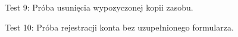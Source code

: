 \begin{figure}[H]
    \centering
    \caption{Test 9: Próba usunięcia wypozyczonej kopii zasobu.}
\end{figure}

\begin{figure}[H]
    \centering
    \caption{Test 10: Próba rejestracji konta bez uzupełnionego formularza.}
\end{figure}

